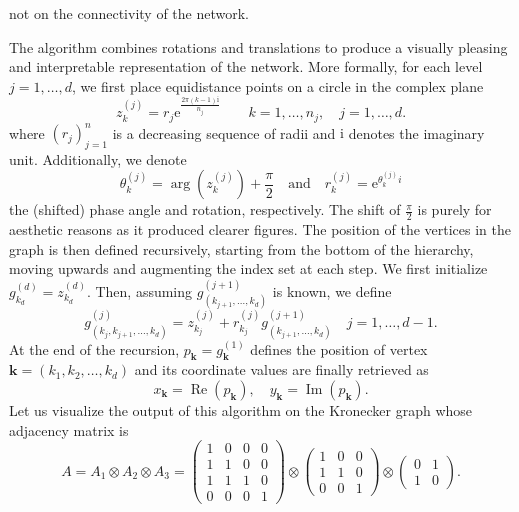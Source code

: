 \documentclass{article}
\numberwithin{equation}{section}
\DeclareMathOperator{\re}{\operatorname{Re}}
\DeclareMathOperator{\im}{\operatorname{Im}}
\theoremstyle{definition}
\begin{document}
not on the connectivity of the network.

The algorithm combines rotations and translations to produce a visually pleasing and interpretable representation of the network. More formally, for each level $j=1,\dots,d$, we first place equidistance points on a circle in the complex plane
\begin{equation*}
    z^{(j)}_{k} = r_j \mathrm{e}^{\frac{2 \pi (k-1) \mathrm{i}}{n_j}} \qquad k=1,\dots, n_j, \quad j=1,\dots,d.
\end{equation*}
where $(r_j)_{j=1}^n$ is a decreasing sequence of radii and $\mathrm{i}$ denotes the imaginary unit. Additionally, we denote
\begin{equation*}
    \theta^{(j)}_{k} = \arg(z^{(j)}_{k}) + \frac{\pi}{2} \quad \text{and} \quad r^{(j)}_{k} = \mathrm{e}^{\theta^{(j)}_{k} i}
\end{equation*}
the (shifted) phase angle and rotation, respectively. The shift of $\frac{\pi}{2}$ is purely for aesthetic reasons as it produced clearer figures. The position of the vertices in the graph is then defined recursively, starting from the bottom of the hierarchy, moving upwards and augmenting the index set at each step. We first initialize $g^{(d)}_{k_d} = z^{(d)}_{k_d}$. Then, assuming $g^{(j+1)}_{(k_{j+1},\dots,k_d)}$ is known, we define
\begin{equation*}
    g^{(j)}_{(k_j,k_{j+1},\dots,k_d)} = z^{(j)}_{k_j} + r^{(j)}_{k_j} g^{(j+1)}_{(k_{j+1},\dots,k_d)} \quad j=1,\dots,d-1.
\end{equation*}
At the end of the recursion, $p_{\bm{k}} = g^{(1)}_{\bm{k}}$ defines the position of vertex $\bm{k}=(k_1,k_2,\dots,k_d)$ and its coordinate values are finally retrieved as
\begin{equation*}
    x_{\bm{k}} = \re(p_{\bm{k}}), \quad y_{\bm{k}} = \im(p_{\bm{k}}).
\end{equation*}
Let us visualize the output of this algorithm on the Kronecker graph whose adjacency matrix is
\begin{equation}
\label{eq: adjacency_1}
A = A_1 \otimes A_2 \otimes A_3 =
\begin{pmatrix}
1 & 0 & 0 & 0 \\
1 & 1 & 0 & 0 \\
1 & 1 & 1 & 0 \\
0 & 0 & 0 & 1
\end{pmatrix}
\otimes
\begin{pmatrix}
1 & 0 & 0 \\
1 & 1 & 0 \\
0 & 0 & 1
\end{pmatrix}
\otimes
\begin{pmatrix}
0 & 1 \\
1 & 0
\end{pmatrix}.
\end{equation}
\end{document}
